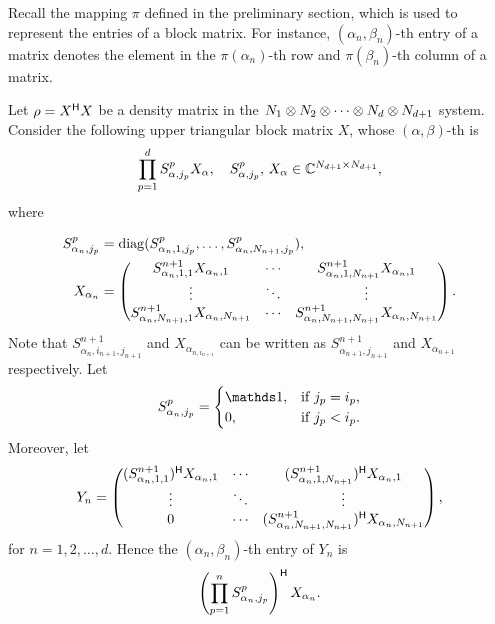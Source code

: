    Recall the mapping $\pi$ defined in the preliminary section, which is used to represent the entries of a block matrix. 
   For instance,  $(\alpha_n,\beta_n)$-th  entry of a matrix denotes   the element in  the $\pi(\alpha_n)$-th
   row and $\pi(\beta_n)$-th column of a matrix. 
   
   Let $\rho = X^{\mathsf{H}} X$ be a density matrix in the  $N_1\otimes N_2\otimes \cdots\linebreak \otimes N_d\otimes N_{d+1}$
   system.
   Consider the following upper triangular block matrix $X$, whose  $(\alpha,\beta)$-th  is
   \begin{equation}
     \label{eq:34}
     \prod_{p=1}^d S^p_{\alpha,j_p} X_{\alpha},\quad S^p_{\alpha,j_p},\,X_{\alpha}\in \mathbb{C}^{N_{d+1}\times N_{d+1}},
   \end{equation}
   where
   
   \begin{align*}
     S^p_{\alpha_n,j_p}&  = \mathrm{diag} (
                          S^p_{\alpha_n,1,j_p},\ldots,S^p_{\alpha_n,N_{n+1},j_p}),\\
     X_{\alpha_n} & =
                    \begin{pmatrix}\tiny
                       S^{n+1}_{\alpha_n,1,1}X_{\alpha_n,1} &\cdots & S^{n+1}_{\alpha_n,1,N_{n+1}}X_{\alpha_n,1}\\
                      \vdots & \ddots& \vdots\\
                       S^{n+1}_{\alpha_n,N_{n+1},1}X_{\alpha_n,N_{n+1}} &\cdots &  S^{n+1}_{\alpha_n,N_{n+1},N_{n+1}}X_{\alpha_n,N_{n+1}}
                    \end{pmatrix}.\\    
   \end{align*}
   Note that $S^{n+1}_{\alpha_n,i_{n+1},j_{n+1}}$ and  $X_{\alpha_{n,i_{n+1}}}$ can be written as
   $S^{n+1}_{\alpha_{n+1},j_{n+1}}$ and  $X_{\alpha_{n+1}}$  respectively. Let
   \begin{equation}
     \label{S}
   S^p_{\alpha_n,j_p}
       =  \begin{cases}
                            \I, &\text{if } j_p = i_p,\\
                            0, & \text{if }j_p < i_p.
           \end{cases}
\end{equation}
	Moreover, let 
\begin{align*}
  Y_{n} =
  \begin{pmatrix}
    (S^{n+1}_{\alpha_n,1,1})^{\mathsf{H}}
    X_{\alpha_n,1} & \cdots & (S^{n+1}_{\alpha_n,1,N_{n+1}})^{\mathsf{H}} X_{\alpha_n,1}\\
\vdots&\ddots&\vdots\\
0&\cdots&( S^{n+1}_{\alpha_n,N_{n+1},N_{n+1}})^{\mathsf{H}}X_{\alpha_n,N_{n+1}}
\end{pmatrix},
\end{align*}
for $n=1,2,\dots,d$. Hence the $(\alpha_n,\beta_n)$-th entry of $Y_n$ is
\begin{equation*}
\left( \prod_{p=1}^n S^p_{\alpha_n,j_p}\right)^{\mathsf{H}} X_{\alpha_n}. 
\end{equation*}

